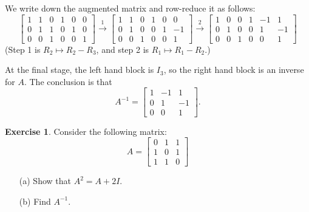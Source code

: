 \documentclass[a4paper]{book}
\newcommand{\bbm}       {\begin{bmatrix}}
\newcommand{\ebm}       {\end{bmatrix}}
\newcommand{\xra}       {\xrightarrow}
\renewcommand{\:}{\colon}
\theoremstyle{definition}
\newtheorem{exercise}[theorem]{Exercise}
\renewenvironment{solution}{\SolutionInline}{\endSolutionInline}
\begin{document}
\begin{solution}
 We write down the augmented matrix and row-reduce it as follows:
 {\newcommand{\h}{\tfrac{1}{2}}\small 
  \[
   \left[\begin{array}{ccc|ccc}
     1& 1& 0 &  1& 0& 0 \\
     0& 1& 1 &  0& 1& 0 \\
     0& 0& 1 &  0& 0& 1
   \end{array}\right] \xra{1}
   \left[\begin{array}{ccc|ccc}
     1& 1& 0 &  1& 0& 0 \\
     0& 1& 0 &  0& 1&-1 \\
     0& 0& 1 &  0& 0& 1
   \end{array}\right] \xra{2}
   \left[\begin{array}{ccc|ccc}
     1& 0& 0 &  1&-1& 1 \\
     0& 1& 0 &  0& 1&-1 \\
     0& 0& 1 &  0& 0& 1
   \end{array}\right]
  \]}
 (Step 1 is $R_2\mapsto R_2-R_3$, and step 2 is $R_1\mapsto R_1-R_2$.)

 At the final stage, the left hand block is $I_3$, so the right hand
 block is an inverse for $A$.  The conclusion is that 
 \[ A^{-1} = \bbm 1&-1&1 \\ 0&1&-1 \\ 0&0&1 \ebm. \]
\end{solution}
\begin{exercise}
 Consider the following matrix:
 \[ A = \bbm
          0 & 1 & 1   \\
          1 & 0 & 1   \\
          1 & 1 & 0
        \ebm
 \]
 \begin{itemize}
  \item[(a)] Show that $A^2=A+2I$.
  \item[(b)] Find $A^{-1}$.
 \end{itemize}
\end{exercise}
\end{document}
